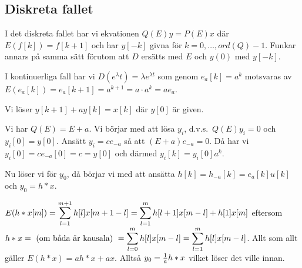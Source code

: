 \documentclass[a4paper]{article}
\begin{document}


\subsection{Diskreta fallet}
I det diskreta fallet har vi ekvationen \(
    Q(E)y = P(E)x
\) där \(
    E(f[k]) = f[k+1]
\) och har \(
    y[-k]
\) givna för \(
    k = 0, \dots, ord(Q)-1
\). Funkar annars på samma sätt förutom att \(
    D 
\) ersätts med \(
    E
\) och \(
    y(0)
\) med \(
    y[-k]
\). 

I kontinuerliga fall har vi \(
    D(e^\lambda t) = \lambda e^{\lambda t}
\) som genom \(
    e_a[k] = a^k
\) motsvaras av \(
    E(e_a[k]) = e_a[k+1] = a^{k+1} = a \cdot a^k = a e_a
\).

\begin{ex}
    Vi löser \(
        y[k+1] + ay[k] = x[k]
    \) där \(
        y[0] 
    \) är given.

    Vi har \(
        Q(E) = E+a
    \). Vi börjar med att lösa \(
        y_i
    \), d.v.s.\ \(
        Q(E)y_i = 0
    \) och \(
        y_i[0] = y[0]
    \). Ansätt \(
        y_i = ce_{-a}
    \) så att \(
        (E+a)e_{-a} = 0
    \). Då har vi \(
        y_i[0] = ce_{-a}[0] = c = y[0]
    \) och därmed \(
        y_i[k] = y_i[0]a^k
    \).

    Nu löser vi för \(
        y_0
    \), då börjar vi med att ansätta \(
        h[k] = h_{-a}[k] = e_a[k]u[k]
    \) och \(
        y_0 = h * x
    \). 

    \(
        E(h*x[m]) = \displaystyle\sum_{l=1}^{m+1} h[l]x[m+1-l] = \displaystyle\sum_{l=1}^m h[l+1]x[m-l] + h[1]x[m]
    \) eftersom \(
        h*x = \text{ (om båda är kausala) } = \displaystyle\sum_{l=0}^m h[l]x[m-l]
        = \displaystyle\sum_{l=1}^m h[l]x[m-l]
    \). Allt som allt gäller \(
        E(h*x) = ah * x + ax
    \). Alltså \(
        y_0 = \frac{1}{a} h* x
    \) vilket löser det ville innan.
\end{ex}

\end{document}
